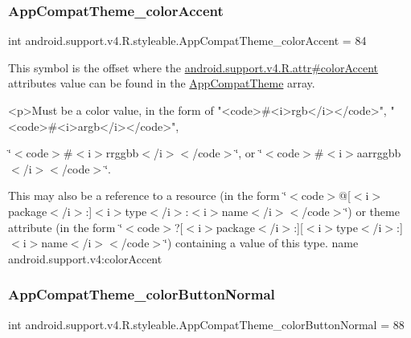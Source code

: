 \subsubsection{\texorpdfstring{App\+Compat\+Theme\+\_\+color\+Accent}{AppCompatTheme\_colorAccent}}
{\footnotesize\ttfamily int android.\+support.\+v4.\+R.\+styleable.\+App\+Compat\+Theme\+\_\+color\+Accent = 84\hspace{0.3cm}{\ttfamily [static]}}

This symbol is the offset where the \hyperlink{classandroid_1_1support_1_1v4_1_1R_1_1attr_a4e16840a7763ba26d0f06f85eb077e73}{android.\+support.\+v4.\+R.\+attr\#color\+Accent} attribute\textquotesingle{}s value can be found in the \hyperlink{classandroid_1_1support_1_1v4_1_1R_1_1styleable_ac07ebbe62ed977f6dcaadc6397840ace}{App\+Compat\+Theme} array.

\begin{DoxyVerb}      <p>Must be a color value, in the form of "<code>#<i>rgb</i></code>", "<code>#<i>argb</i></code>",
\end{DoxyVerb}
 \char`\"{}$<$code$>$\#$<$i$>$rrggbb$<$/i$>$$<$/code$>$\char`\"{}, or \char`\"{}$<$code$>$\#$<$i$>$aarrggbb$<$/i$>$$<$/code$>$\char`\"{}. 

This may also be a reference to a resource (in the form \char`\"{}$<$code$>$@\mbox{[}$<$i$>$package$<$/i$>$\+:\mbox{]}$<$i$>$type$<$/i$>$\+:$<$i$>$name$<$/i$>$$<$/code$>$\char`\"{}) or theme attribute (in the form \char`\"{}$<$code$>$?\mbox{[}$<$i$>$package$<$/i$>$\+:\mbox{]}\mbox{[}$<$i$>$type$<$/i$>$\+:\mbox{]}$<$i$>$name$<$/i$>$$<$/code$>$\char`\"{}) containing a value of this type.  name android.\+support.\+v4\+:color\+Accent \mbox{\label{classandroid_1_1support_1_1v4_1_1R_1_1styleable_a348ced1d660bc34dcde74f87751119ba}} 
\subsubsection{\texorpdfstring{App\+Compat\+Theme\+\_\+color\+Button\+Normal}{AppCompatTheme\_colorButtonNormal}}
{\footnotesize\ttfamily int android.\+support.\+v4.\+R.\+styleable.\+App\+Compat\+Theme\+\_\+color\+Button\+Normal = 88\hspace{0.3cm}{\ttfamily [static]}}

